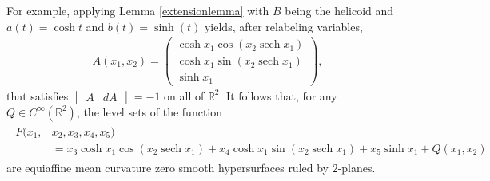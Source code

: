 \documentclass [leqno, 10pt]{amsart}
\theoremstyle{definition}
\numberwithin{equation}{section}
\newcommand{\sech}{\operatorname{sech}}
\newcommand{\cinf}{C^{\infty}}
\newcommand{\rea}{\mathbb R}
\begin{document}
For example, applying Lemma \ref{extensionlemma} with $B$ being the helicoid and $a(t) = \cosh t$ and $b(t) = \sinh(t)$ yields, after relabeling variables,
\begin{align}
A(x_{1}, x_{2}) = \begin{pmatrix} \cosh{x_{1}} \cos( x_{2}\sech{x_{1}}) \\ \cosh{x_{1}}\sin( x_{2}\sech{x_{1}})  \\ \sinh{x_{1}} \end{pmatrix},
\end{align}
that satisfies $\begin{vmatrix} A & dA \end{vmatrix} = -1$ on all of $\rea^{2}$. It follows that, for any $Q \in \cinf(\rea^{2})$, the level sets of the function 
\begin{align}
\begin{split}
F(x_{1}, &x_{2}, x_{3}, x_{4}, x_{5}) \\
&= x_{3} \cosh{x_{1}} \cos( x_{2}\sech{x_{1}}) + x_{4} \cosh{x_{1}} \sin( x_{2}\sech{x_{1}}) + x_{5}\sinh{x_{1}} + Q(x_{1}, x_{2})
\end{split}
\end{align}
are equiaffine mean curvature zero smooth hypersurfaces ruled by $2$-planes. 
\end{document}
